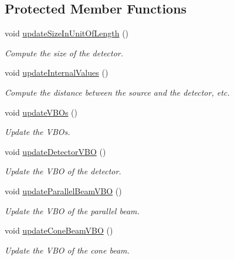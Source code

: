 \subsection*{Protected Member Functions}
\begin{DoxyCompactItemize}
\item 
void \hyperlink{classg_virtual_x_ray_1_1_x_ray_detector_a0af3ef3845b74a97c343b104b4b8b3de}{updateSizeInUnitOfLength} ()
\begin{DoxyCompactList}\small\item\em Compute the size of the detector. \end{DoxyCompactList}\item 
void \hyperlink{classg_virtual_x_ray_1_1_x_ray_detector_a5e1c0c7e3bc3de8d7b53fb7a39449531}{updateInternalValues} ()
\begin{DoxyCompactList}\small\item\em Compute the distance between the source and the detector, etc. \end{DoxyCompactList}\item 
void \hyperlink{classg_virtual_x_ray_1_1_x_ray_detector_a80b7e44aebf23505d0bbefb5001eb42b}{updateVBOs} ()
\begin{DoxyCompactList}\small\item\em Update the VBOs. \end{DoxyCompactList}\item 
void \hyperlink{classg_virtual_x_ray_1_1_x_ray_detector_a8b88ed5684d2baa3434cb6435fe60307}{updateDetectorVBO} ()
\begin{DoxyCompactList}\small\item\em Update the VBO of the detector. \end{DoxyCompactList}\item 
void \hyperlink{classg_virtual_x_ray_1_1_x_ray_detector_a9680618cf54382c498233104faede526}{updateParallelBeamVBO} ()
\begin{DoxyCompactList}\small\item\em Update the VBO of the parallel beam. \end{DoxyCompactList}\item 
void \hyperlink{classg_virtual_x_ray_1_1_x_ray_detector_a672cdc396edb08fac9e33a95d17baa7d}{updateConeBeamVBO} ()
\begin{DoxyCompactList}\small\item\em Update the VBO of the cone beam. \end{DoxyCompactList}\end{DoxyCompactItemize}
